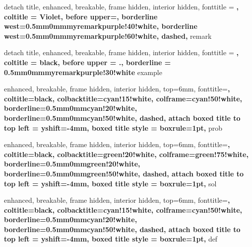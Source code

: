 {%
	detach title,
	enhanced,
	breakable,
	frame hidden,
	interior hidden,
	fonttitle = \bfseries,
	coltitle = Violet,
	before upper={\tcbtitle\quad},
	borderline west={0.5mm}{0mm}{myremarkpurple!40!white},
	borderline west={0.5mm}{0mm}{myremarkpurple!60!white, dashed},
}{remark}

%
{%
	detach title,
	enhanced,
	breakable,
	frame hidden,
	interior hidden,
	fonttitle = \bfseries,
	coltitle = black,
	before upper = {\tcbtitle.\quad},
	borderline = {0.5mm}{0mm}{myremarkpurple!30!white}
}{example}

\renewenvironment{proof}[1][\proofname]{\textbf{\textit{#1.}}}{\qed}

{%
	enhanced,
	breakable,
	frame hidden,
	interior hidden,
	top=6mm,
	fonttitle=\bfseries,
	coltitle=black,
	colbacktitle=cyan!15!white,
	colframe=cyan!50!white,
	borderline={0.5mm}{0mm}{cyan!20!white},
	borderline={0.5mm}{0mm}{cyan!50!white, dashed},
	attach boxed title to top left = {yshift=-4mm},
	boxed title style = {boxrule=1pt},
}{prob}
\makeatletter
\newcommand\tcb@cnt@problemautorefname{Problem}
\makeatother

{%
	enhanced,
	breakable,
	frame hidden,
	interior hidden,
	top=6mm,
	fonttitle=\bfseries,
	coltitle=black,
	colbacktitle=green!20!white,
	colframe=green!75!white,
	borderline={0.5mm}{0mm}{green!20!white},
	borderline={0.5mm}{0mm}{green!50!white, dashed},
	attach boxed title to top left = {yshift=-4mm},
	boxed title style = {boxrule=1pt},
}{sol}

{%
	enhanced,
	breakable,
	frame hidden,
	interior hidden,
	top=6mm,
	fonttitle=\bfseries,
	coltitle=black,
	colbacktitle=cyan!15!white,
	colframe=cyan!50!white,
	borderline={0.5mm}{0mm}{cyan!20!white},
	borderline={0.5mm}{0mm}{cyan!50!white, dashed},
	attach boxed title to top left = {yshift=-4mm},
	boxed title style = {boxrule=1pt},
}{def}

\newtheorem*{notation}{Notation}
\newtheorem*{note}{Note}
\newtheorem*{observe}{Observe}
\newtheorem*{property}{Property}
\newtheorem*{intuition}{Intuition}
\newtheorem{question}{Question}


\linespread{1.5}

\pagestyle{fancy}
